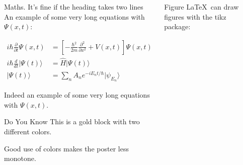 \documentclass{purdue-poster}
\newlength{\postercolsep}
\newcommand{\postercolwidth}[1]{\dimeval{#1-\postercolsep}}
\begin{document}
\begin{frame}{}
\begin{columns}[onlytextwidth, t]
\begin{column}{\postercolwidth{.6\linewidth}}
\begin{columns}[onlytextwidth, t]
\begin{column}{\postercolwidth{.5\linewidth}}
            \end{column}

            \begin{column}{\postercolwidth{.5\linewidth}}
                
                \begin{plainblock}{Maths. It's fine if the heading takes two lines}
                    An example of some very long equations with $\Psi (x,t)$:
                    
                    \begin{align}
                    i\hbar {\frac {\partial }{\partial t}}\Psi (x,t)&=\left[-{\frac {\hbar ^{2}}{2m}}{\frac {\partial ^{2}}{\partial x^{2}}}+V(x,t)\right]\Psi (x,t) \\
                    i\hbar {\frac {d}{dt}}\vert \Psi (t)\rangle &={\hat {H}}\vert \Psi (t)\rangle \\ 
                    |\Psi (t)\rangle &=\sum _{n}A_{n}e^{{-iE_{n}t}/\hbar }|\psi _{E_{n}}\rangle
                    \end{align}
                    
                    Indeed an example of some very long equations with $\Psi (x,t)$.
                \end{plainblock}

                \vspace{2em}

                \begin{block}{Do You Know}
                    This is a gold block with two different colors.
                    
                    Good use of colors makes the poster less monotone.
                \end{block}

            \end{column}
            
        \end{columns}
    
    \end{column}

    \begin{column}{\postercolwidth{.4\linewidth}}
        
        \begin{plainblock}{Figure}
            \LaTeX\ can draw figures with the tikz package:


\end{plainblock}
\end{column}
\end{columns}
\end{frame}
\end{document}
